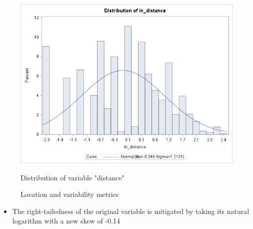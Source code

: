 \documentclass[12pt]{article}
\begin{document}
\begin{figure}[h]
    \centering
    \begin{minipage}[t]{0.65\textwidth}
        \vspace{0pt}
        \centering
        \includegraphics[width=\textwidth]{images/ln_distance_hist.png}
        \caption{Distribution of variable "distance"}
        \label{fig:ln_distance_dist}
    \end{minipage}\hfill
    \begin{minipage}[t]{0.3\textwidth}
        \vspace{15pt}
        \centering
        
        \caption{Location and variability metrics}
        \label{fig:ln_distance_measures}
    \end{minipage}
    \label{fig:ln_distance_fig}
\end{figure}
\newpage
\begin{itemize}
    \item The right-tailedness of the original variable is mitigated by taking its natural logarithm with a new skew of -0.14
\end{itemize}
\end{document}
